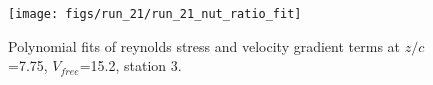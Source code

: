 \begin{figure}[H]
\centering
\texttt{[image: figs/run\_21/run\_21\_nut\_ratio\_fit]}
\caption{Polynomial fits of reynolds stress and velocity gradient terms at $z/c$=7.75, $V_{free}$=15.2, station 3.}
\label{fig:run_21_nut_ratio_fit}
\end{figure}


